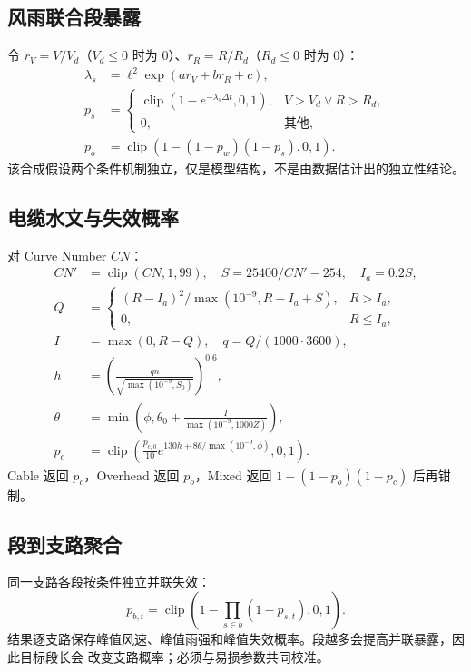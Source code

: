 \subsection{风雨联合段暴露}
令 $r_V=V/V_d$（$V_d\le0$ 时为 0）、$r_R=R/R_d$（$R_d\le0$ 时为 0）：
\begin{align}
 \lambda_s&=\ell^2\exp(a r_V+b r_R+c),\\
 p_s&=\begin{cases}
 \operatorname{clip}(1-e^{-\lambda_s\Delta t},0,1),&V>V_d\lor R>R_d,\\
 0,&\text{其他},
 \end{cases}\\
 p_o&=\operatorname{clip}(1-(1-p_w)(1-p_s),0,1).
\end{align}
该合成假设两个条件机制独立，仅是模型结构，不是由数据估计出的独立性结论。

\subsection{电缆水文与失效概率}
对 Curve Number $CN$：
\begin{align}
 CN'&=\operatorname{clip}(CN,1,99),\quad S=25400/CN'-254,\quad I_a=0.2S,\\
 Q&=\begin{cases}(R-I_a)^2/\max(10^{-9},R-I_a+S),&R>I_a,\\0,&R\le I_a,\end{cases}\\
 I&=\max(0,R-Q),\quad q=Q/(1000\cdot3600),\\
 h&=\left(\frac{q n}{\sqrt{\max(10^{-9},S_0)}}\right)^{0.6},\\
 \theta&=\min\left(\phi,\theta_0+\frac{I}{\max(10^{-9},1000Z)}\right),\\
 p_c&=\operatorname{clip}\left(\frac{p_{c,0}}{10}
 e^{130h+8\theta/\max(10^{-9},\phi)},0,1\right).
\end{align}
Cable 返回 $p_c$，Overhead 返回 $p_o$，Mixed 返回 $1-(1-p_o)(1-p_c)$ 后再钳制。

\subsection{段到支路聚合}
同一支路各段按条件独立并联失效：
\begin{equation}
 p_{b,t}=\operatorname{clip}\left(1-\prod_{s\in b}(1-p_{s,t}),0,1\right).
\end{equation}
结果逐支路保存峰值风速、峰值雨强和峰值失效概率。段越多会提高并联暴露，因此目标段长会
改变支路概率；必须与易损参数共同校准。


